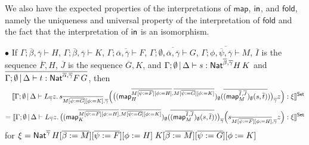 \documentclass[runningheads]{llncs}
\newcommand{\map}{\mathsf{map}}
\newcommand{\fold}{\mathsf{fold}}
\begin{document}
    \vspace*{-0.1in}
  
\noindent
We also have the expected properties of the interpretations of $\map$,
$\mathsf{in}$, and $\fold$, namely the uniqueness and universal property of
the interpretation of $\fold$ and the fact that the interpretation of
$\mathsf{in}$ is an isomorphism.

{\color{red}
\noindent
$\bullet$\; If $\Gamma; \overline{\beta}, \overline{\gamma} \vdash
H$,\; $\Gamma; \overline{\beta}, \overline{\gamma} \vdash K$,\;
$\overline{\Gamma; \overline{\alpha}, \overline{\gamma} \vdash F}$,\;
$\overline{\Gamma; \emptyset, \overline{\alpha}, \overline{\gamma}
  \vdash G}$,\; 
$\overline{\Gamma; \phi, \overline{\psi}, \overline{\gamma} \vdash
  M}$,\; $\overline{I}$ is the sequence $\overline{F}, H$,\;
$\overline{J}$ is the sequence $\overline{G}, K$, and $\Gamma;
\emptyset\,|\,\Delta \vdash s : \mathsf{Nat}^{\overline{\beta},
  \overline{\gamma}} H\, K$ and $\overline{\Gamma; \emptyset \,|\,\Delta \vdash
  t : \mathsf{Nat}^{\overline{\alpha}, \overline{\gamma}} F\, G}$, then
\[\hspace*{0.13in}\setsem{\Gamma; \emptyset \,|\, \Delta
    \vdash L_{\overline{\gamma}} z.\,
    s_{\overline{M [\overline{\psi := G}] [\phi := K]},
      \overline{\gamma}} \Big(\big( (\map_{H}^{\overline{M
        [\overline{\psi := F}] [\phi := H]}, \overline{M
        [\overline{\psi := G}] [\phi := K]}})_\emptyset
    (\overline{(\map_{M}^{\overline{I}, \overline{J}})_\emptyset
      (s, \overline{t})}) \big)_{\overline{\gamma}} z \Big) : \xi}\]
\[= \setsem{\Gamma; \emptyset\,|\, \Delta \vdash
    L_{\overline{\gamma}} z.\, \big( (\map_{K}^{\overline{M
      [\overline{\psi := F}] [\phi := H]}, \overline{M [\overline{\psi
          := G}] [\phi := K]}})_\emptyset (\overline{(\map_{M}^{\overline{I},
    \overline{J}})_\emptyset (s, \overline{t})}) \big)_{\overline{\gamma}} \Big(
s_{\overline{M [\overline{\psi := F}] [\phi := H]}, \overline{\gamma}}
z \Big) : \xi}\] for $\xi = \mathsf{Nat}^{\overline{\gamma}}\,
  H[\overline{\beta:= M}] [\overline{\psi := F}] [\phi := H]\;
  K[\overline{\beta := M}] [\overline{\psi := G}] [\phi := K]$
}
\end{document}
